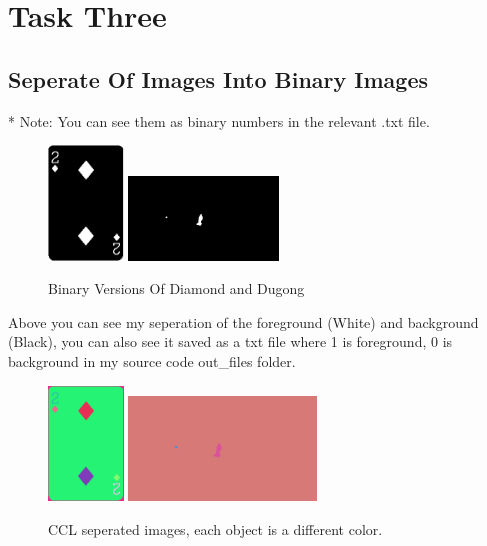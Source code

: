 \documentclass[conference]{IEEEtran}
\begin{document}
\section{Task Three}
\subsection{Seperate Of Images Into Binary Images}
* Note: You can see them as binary numbers in the relevant .txt file.
\begin{figure}[H]
    \centerline{
        {\includegraphics[width=20mm, scale=0.5]{./figures/task 3/Diamond.png}}
        {\includegraphics[width=40mm, scale=0.5]{./figures/task 3/BinaryImage.png}}
    }
    \caption{Binary Versions Of Diamond and Dugong}
    \label{fig}
\end{figure}
Above you can see my seperation of the foreground (White) and background (Black), you can also see it saved as a txt file where 1 is foreground, 0 is background in my source code out\_files folder.
\begin{figure}[H]
    \centerline{
        {\includegraphics[width=20mm, scale=0.5]{./figures/task 3/card/detectedObjectsCCL.png}}
        {\includegraphics[width=50mm, scale=0.5]{./figures/task 3/dugong/detectedObjectsCCL.png}}
    }
    \caption{CCL seperated images, each object is a different color.}
    \label{fig}
\end{figure}
\end{document}

